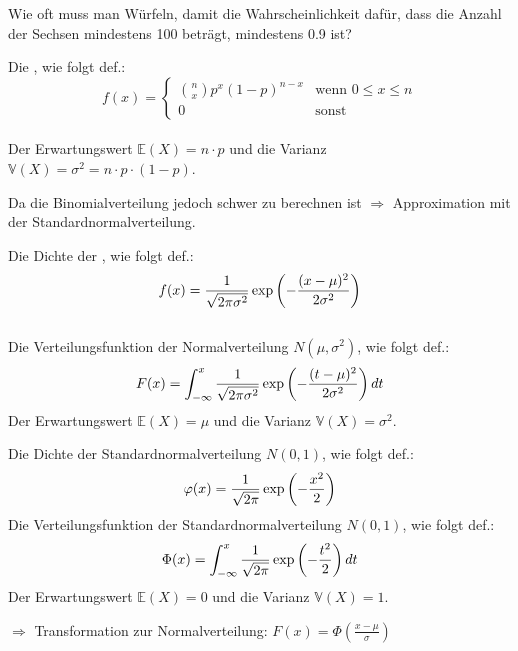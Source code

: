 \begin{uebsp}
\begin{Exercise}[label=ex:3.6]
Wie oft muss man Würfeln, damit die Wahrscheinlichkeit dafür, dass die Anzahl der Sechsen mindestens 100 beträgt, mindestens 0.9 ist?
\end{Exercise}
\begin{Answer}
\begin{uebsp_theory}
    Die , wie folgt def.:
        \[f(x) = \begin{cases} 
                    \binom{n}{x}p^x(1-p)^{n-x} &\mbox{wenn } 0\leq x\leq n \\
                    0 & \mbox{sonst}
    \end{cases}\]\\
    Der Erwartungswert $\mathbb{E}(X)=n\cdot p$ und die Varianz $\mathbb{V}(X)=\sigma^2=n\cdot p\cdot (1-p)$.
\end{uebsp_theory}

    Da die Binomialverteilung jedoch schwer zu berechnen ist $\Rightarrow$ Approximation mit der Standardnormalverteilung.

\begin{uebsp_theory}
    Die Dichte der , wie folgt def.:
        \[f(x) = {1\over\sqrt{2\pi\sigma^2}}\exp\left(-{(x-\mu)^2\over 2\sigma^2}\right)\]\\
    Die Verteilungsfunktion der Normalverteilung $N(\mu,\sigma^2)$, wie folgt def.:
        \[F(x) = \int_{-\infty}^x{1\over{\sqrt{2\pi\sigma^2}}}\exp\left(-\frac{(t-\mu)^2}{2\sigma^2}\right)dt\]
    Der Erwartungswert $\mathbb{E}(X)=\mu$ und die Varianz $\mathbb{V}(X)=\sigma^2$.
\end{uebsp_theory}

\begin{uebsp_theory}
    Die Dichte der Standardnormalverteilung $N(0,1)$, wie folgt def.:
        \[\varphi(x) ={1\over\sqrt{2\pi}}\exp\left(-{x^2\over 2}\right)\]
    Die Verteilungsfunktion der Standardnormalverteilung $N(0,1)$, wie folgt def.:
        \[\Phi(x) = \int_{-\infty}^x{1\over\sqrt{2\pi}}\exp\left(-{t^2\over 2}\right)dt\]
    Der Erwartungswert $\mathbb{E}(X)=0$ und die Varianz $\mathbb{V}(X)=1$.

    $\Rightarrow$ Transformation zur Normalverteilung: $F(x)=\Phi\left(\frac{x-\mu}{\sigma}\right)$
\end{uebsp_theory}


\end{Answer}
\end{uebsp}
